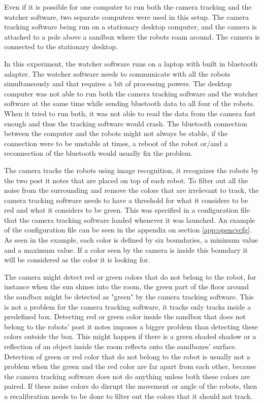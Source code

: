 Even if it is possible for one computer to run both the camera tracking and the watcher software, two separate computers were used in this setup. The camera tracking software being run on a stationary desktop computer, and the camera is attached to a pole above a sandbox where the robots roam around. The camera is connected to the stationary desktop. 

In this experiment, the watcher software runs on a laptop with built in bluetooth adapter. The watcher software needs to communicate with all the robots simultaneously and that requires a bit of processing powers.
The desktop computer was not able to run both the camera tracking software and the watcher software at the same time while sending bluetooth data to all four of the robots. When it tried to run both, it was not able to read the data from the camera fast enough and thus the tracking software would crash. The bluetooth connection between the computer and the robots might not always be stable, if the connection were to be unstable at times, a reboot of the robot or/and a reconnection of the bluetooth would usually fix the problem.

The camera tracks the robots using image recognition, it recognizes the robots by the two post it notes that are placed on top of each robot. 
To filter out all the noise from the surrounding and remove the colors that are irrelevant to track, the camera tracking software needs to have a threshold for what it considers to be red and what it considers to be green. This was specified in a configuration file that the camera tracking software loaded whenever it was launched. An example of the configuration file can be seen in the appendix on section \ref{app:opencvcfg}. As seen in the example, each color is defined by six boundaries, a minimum value and a maximum value. If a color seen by the camera is inside this boundary it will be considered as the color it is looking for. 

The camera might detect red or green colors that do not belong to the robot, for instance when the sun shines into the room, the green part of the floor around the sandbox might be detected as "green" by the camera tracking software. This is not a problem for the camera tracking software, it tracks only tracks inside a predefined box. %
Detecting red or green color inside the sandbox that does not belong to the robots' post it notes imposes a bigger problem than detecting these colors outside the box. This might happen if there is a green shaded shadow or a reflection of an object inside the room reflects onto the sandboxes' surface. 
Detection of green or red color that do not belong to the robot is usually not a problem when the green and the red color are far apart from each other, because the camera tracking software does not do anything unless both these colors are paired. If these noise colors do disrupt the movement or angle of the robots, then a recalibration needs to be done to filter out the colors that it should not track.

